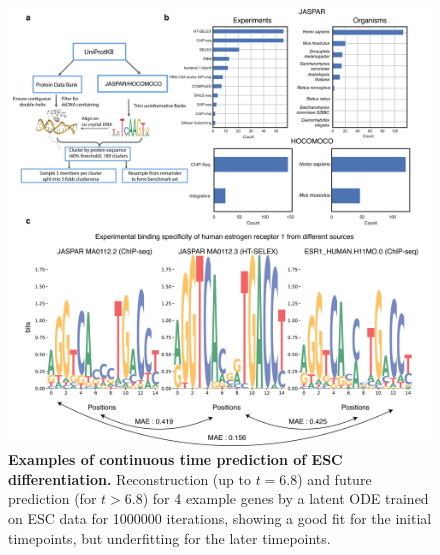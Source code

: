 \begin{center}
\begin{figure}[H]
  \includegraphics[width=\linewidth]{./pdnafigs/figS1.png}
    \caption[Examples of continuous time prediction of ESC differentiation.]{\textbf{Examples of continuous time prediction of ESC differentiation.} Reconstruction (up to $t=6.8$) and future prediction (for $t>6.8$) for 4 example genes by a  latent ODE \citep{chen2018neural} trained on ESC data \citep{Klein2015} for 1000000 iterations, showing a good fit for the initial timepoints, but underfitting for the later timepoints.}
  \label{fig:pdnaS1}
\end{figure}
\end{center}

